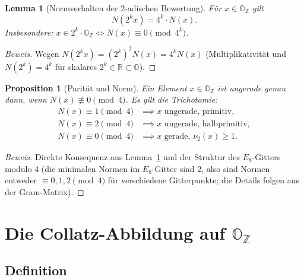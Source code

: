 \documentclass[12pt,a4paper]{article}
\newtheorem{proposition}[definition]{Proposition}
\newtheorem{lemma}[definition]{Lemma}
\newenvironment{beweis}{\begin{proof}[Beweis]}{\end{proof}}
\newcommand{\vii}{\nu_2}           %
\newcommand{\OZ}{\mathbb{O}_{\mathbb{Z}}}  %
\newcommand{\OO}{\mathbb{O}}       %
\newcommand{\Norm}[1]{N(#1)}       %
\newcommand{\R}{\mathbb{R}}
\begin{document}
\begin{lemma}[Normverhalten der 2-adischen Bewertung]\label{lem:norm-nu2}
Für $x \in \OZ$ gilt
\[
  \Norm{2^k x} = 4^k \cdot \Norm{x}.
\]
Insbesondere: $x \in 2^k \cdot \OZ \Longleftrightarrow \Norm{x} \equiv 0 \pmod{4^k}$.
\end{lemma}

\begin{beweis}
Wegen $\Norm{2^k x} = (2^k)^2 \Norm{x} = 4^k \Norm{x}$ (Multiplikativität
und $\Norm{2^k} = 4^k$ für skalares $2^k \in \R \subset \OO$).
\end{beweis}

\begin{proposition}[Parität und Norm]\label{prop:parität}
Ein Element $x \in \OZ$ ist ungerade genau dann, wenn $\Norm{x} \not\equiv 0 \pmod 4$.
Es gilt die Trichotomie:
\begin{align*}
  \Norm{x} \equiv 1 \pmod 4 &\implies x \text{ ungerade, primitiv},\\
  \Norm{x} \equiv 2 \pmod 4 &\implies x \text{ ungerade, halbprimitiv},\\
  \Norm{x} \equiv 0 \pmod 4 &\implies x \text{ gerade, } \vii(x) \geq 1.
\end{align*}
\end{proposition}

\begin{beweis}
Direkte Konsequenz aus Lemma~\ref{lem:norm-nu2} und der Struktur des
$E_8$-Gitters modulo 4 (die minimalen Normen im $E_8$-Gitter sind 2,
also sind Normen entweder $\equiv 0,1,2 \pmod 4$ für verschiedene
Gitterpunkte; die Details folgen aus der Gram-Matrix).
\end{beweis}

\section{Die Collatz-Abbildung auf \texorpdfstring{$\OZ$}{OZ}}

\subsection{Definition}
\end{document}
